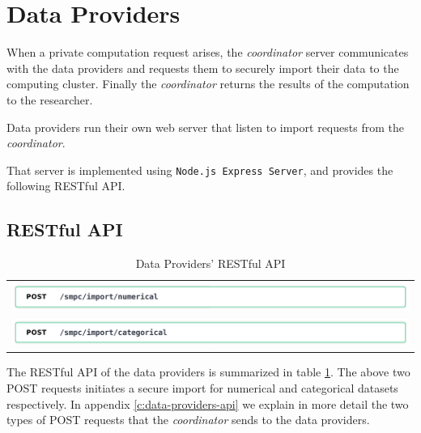
\section{Data Providers}\label{s:impl-data-providers}
When a private computation request arises, the \textit{coordinator} server communicates with the data providers and requests them to securely import their data to the computing cluster.
Finally the \textit{coordinator} returns the results of the computation to the researcher.

Data providers run their own web server that listen to import requests from the \textit{coordinator}.

That server is implemented using \texttt{Node.js Express Server}, and provides the following RESTful API.



\subsection{RESTful API}\label{ss:data-providers-restful-api}


\begin{table}[H]
  \centering
  \caption{Data Providers' RESTful API}
  \label{t:data-providers-api}
\begin{tabular}{l}
  \hyperref[s:post4]{\includegraphics[page=1,width=\textwidth]{figures/post4.pdf}} \\
  \hyperref[s:post5]{\includegraphics[page=1,width=\textwidth]{figures/post5.pdf}} \\
\end{tabular}
\end{table}


The RESTful API of the data providers is summarized in table \ref{t:data-providers-api}.
The above two POST requests initiates a secure import for numerical and categorical datasets respectively.
In appendix \ref{c:data-providers-api} we explain in more detail the two types of POST requests that the \textit{coordinator} sends to the data providers.


